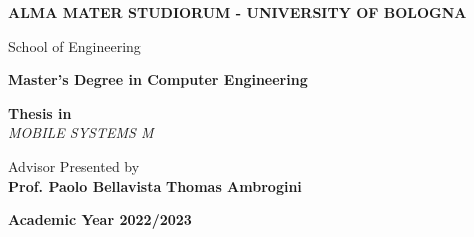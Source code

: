 \begin{titlepage}

    \begin{center}
        \large{\textbf{ALMA MATER STUDIORUM - UNIVERSITY OF BOLOGNA}}
    \end{center}

    \vspace{0.25cm}

    \begin{center}
        \large {School of Engineering}
    \end{center}

    \vspace{0.25cm}

    \begin{center}
        \large {\textbf{Master's Degree in Computer Engineering}}
    \end{center}

    \vspace{2cm}

    \begin{center}
        \textit{\mytitle}
    \end{center}

    \vspace{0.5cm}

    \begin{center}
        \large {\textbf{Thesis in}}\\
        \vspace{0.2cm}
        \textit{MOBILE SYSTEMS M}
    \end{center}

    \vspace{2cm}

    \noindent
    \large{{Advisor}} \hfill \large{{Presented by}}\\
    \large{\textbf{Prof. Paolo Bellavista}} \hfill \large{\textbf{Thomas Ambrogini}}

    \vspace{2cm}

    \begin{center}
        \large {\textbf{Academic Year 2022/2023}}
    \end{center}

\end{titlepage}

